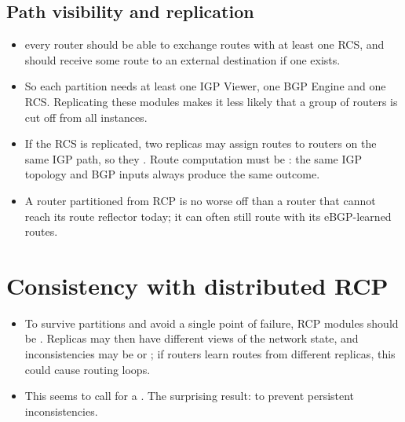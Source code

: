 \subsection{Path visibility and replication}
\begin{itemize}
\item {} every router should be able to exchange routes with at least one RCS, and should receive some route to an external destination if one exists.
\item So each partition needs at least one IGP Viewer, one BGP Engine and one RCS. Replicating these modules makes it less likely that a group of routers is cut off from all instances.
\item If the RCS is replicated, two replicas may assign routes to routers on the same IGP path, so they . Route computation must be : the same IGP topology and BGP inputs always produce the same outcome.
\item A router partitioned from RCP is no worse off than a router that cannot reach its route reflector today; it can often still route with its eBGP-learned routes.
\end{itemize}

\section{Consistency with distributed RCP}
\begin{itemize}
\item To survive partitions and avoid a single point of failure, RCP modules should be . Replicas may then have different views of the network state, and inconsistencies may be  or ; if routers learn routes from different replicas, this could cause routing loops.
\item This seems to call for a . The surprising result:  to prevent persistent inconsistencies.
\end{itemize}

